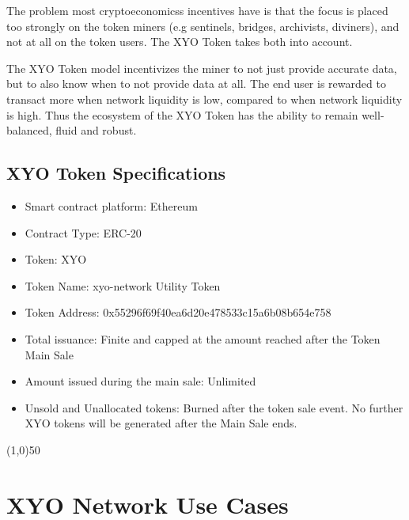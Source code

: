 \documentclass{article}
\begin{document}
The problem most \glspl{cryptoeconomics} incentives have is that the focus is placed too strongly on the token miners (e.g \Glspl{sentinel}, \Glspl{bridge}, \Glspl{archivist}, \Glspl{diviner}), and not at all on the token users. The XYO Token takes both into account.

The XYO Token model incentivizes the miner to not just provide accurate data, but to also know when to not provide data at all. The end user is rewarded to transact more when network liquidity is low, compared to when network liquidity is high. Thus the ecosystem of the XYO Token has the ability to remain well-balanced, fluid and robust.

\subsection {XYO Token Specifications}
\begin{itemize}
\item Smart contract platform: Ethereum
\item Contract Type: ERC-20
\item Token: XYO
\item Token Name: \Gls{xyo-network} Utility Token
\item Token Address: 0x55296f69f40ea6d20e478533c15a6b08b654e758
\item Total issuance: Finite and capped at the amount reached after the Token Main Sale
\item Amount issued during the main sale: Unlimited
\item Unsold and Unallocated tokens: Burned after the token sale event. No further XYO tokens will be generated after the Main Sale ends.
\end{itemize}

\begin{center}
\line(1,0){50}
\end{center}

\section{XYO Network Use Cases}
\end{document}
